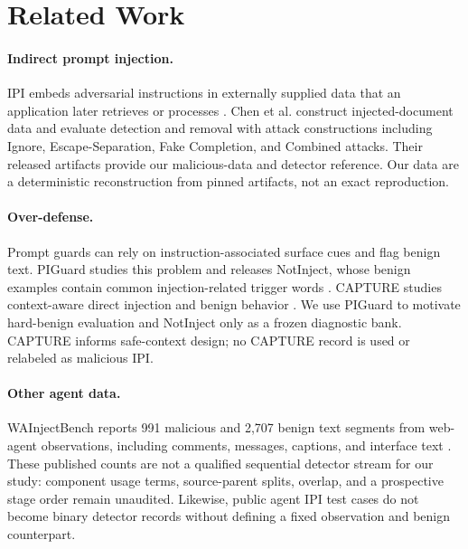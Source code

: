 \documentclass[conference]{IEEEtran}
\begin{document}
\section{Related Work}
\paragraph{Indirect prompt injection.}
IPI embeds adversarial instructions in externally supplied data that an application later retrieves or processes \cite{greshake2023indirect}. Chen et al. \cite{chen2025indirect} construct injected-document data and evaluate detection and removal with attack constructions including Ignore, Escape-Separation, Fake Completion, and Combined attacks. Their released artifacts provide our malicious-data and detector reference. Our data are a deterministic reconstruction from pinned artifacts, not an exact reproduction.

\paragraph{Over-defense.}
Prompt guards can rely on instruction-associated surface cues and flag benign text. PIGuard studies this problem and releases NotInject, whose benign examples contain common injection-related trigger words \cite{li2025piguard}. CAPTURE studies context-aware direct injection and benign behavior \cite{kholkar2025capture}. We use PIGuard to motivate hard-benign evaluation and NotInject only as a frozen diagnostic bank. CAPTURE informs safe-context design; no CAPTURE record is used or relabeled as malicious IPI.

\paragraph{Other agent data.}
WAInjectBench reports 991 malicious and 2,707 benign text segments from web-agent observations, including comments, messages, captions, and interface text \cite{liu2026wainjectbench}. These published counts are not a qualified sequential detector stream for our study: component usage terms, source-parent splits, overlap, and a prospective stage order remain unaudited. Likewise, public agent IPI test cases do not become binary detector records without defining a fixed observation and benign counterpart.
\end{document}
